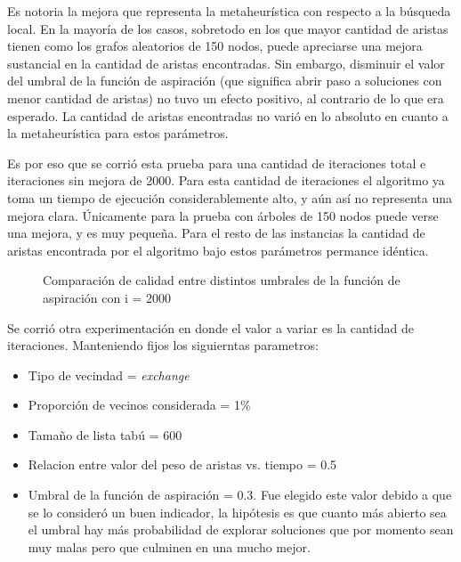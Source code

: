 Es notoria la mejora que representa la metaheurística con respecto a la búsqueda local. En la mayoría de los casos, sobretodo en los que mayor cantidad de aristas tienen como los grafos aleatorios de 150 nodos, puede apreciarse una mejora sustancial en la cantidad de aristas encontradas. Sin embargo, disminuir el valor del umbral de la función de aspiración (que significa abrir paso a soluciones con menor cantidad de aristas) no tuvo un
efecto positivo, al contrario de lo que era esperado. La cantidad de aristas encontradas no varió en lo absoluto en cuanto a la metaheurística para estos parámetros.

Es por eso que se corrió esta prueba para una cantidad de iteraciones total e iteraciones sin mejora de 2000. Para esta cantidad de iteraciones el algoritmo ya toma un tiempo de ejecución considerablemente alto, y aún así no representa una mejora clara. Únicamente para la prueba con árboles de 150 nodos puede verse una mejora, y es muy pequeña. Para el resto de las instancias la cantidad de aristas encontrada por el algoritmo bajo estos parámetros permance idéntica.

\begin{figure}[H]
    \centering
    \caption{Comparación de calidad entre distintos umbrales de la función de aspiración con i = 2000}
    \pgfplotstabletypeset[
        columns={0, solutions, localsearch, highiterationlowaspiration, highiterationhighaspiration, highiterationfullaspiration}
    ]{\optimalsolutions}
\end{figure}

Se corrió otra experimentación en donde el valor a variar es la cantidad de iteraciones. Manteniendo fijos los siguierntas parametros:

\begin{itemize}
\item Tipo de vecindad = \textit{exchange}
\item Proporción de vecinos considerada = 1\%
\item Tamaño de lista tabú = 600
\item Relacion entre valor del peso de aristas vs. tiempo = 0.5
\item Umbral de la función de aspiración = 0.3. Fue elegido este valor debido
a que se lo consideró un buen indicador, la hipótesis es que cuanto más
abierto sea el umbral hay más probabilidad de explorar soluciones que por
momento sean muy malas pero que culminen en una mucho mejor.
\end{itemize}


